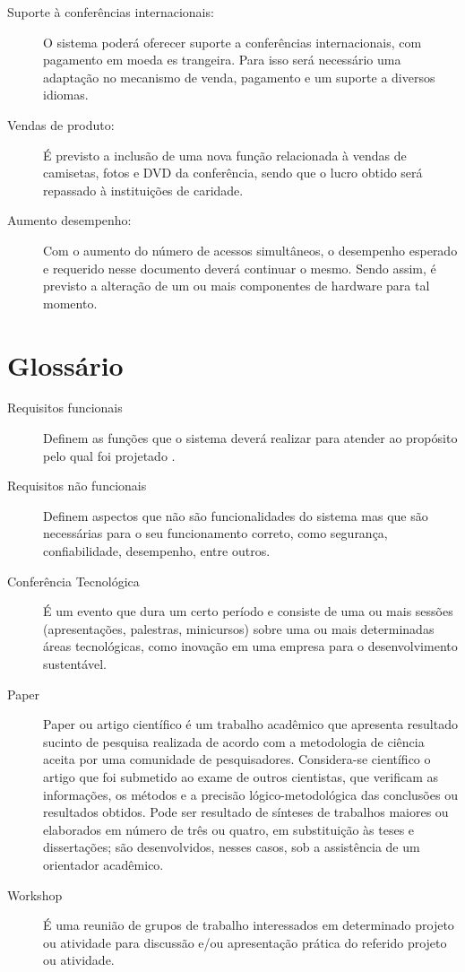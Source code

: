\documentclass[letter]{article}
\begin{document}
\begin{description}

\item[Suporte à conferências internacionais:]  O sistema poderá oferecer suporte a conferências internacionais, com pagamento em moeda es trangeira. Para isso será necessário uma adaptação no mecanismo de venda, pagamento e um suporte a diversos idiomas.

\item[Vendas de produto:]  É previsto a inclusão de uma nova função relacionada à vendas de camisetas, fotos e DVD da conferência, sendo que o lucro obtido será repassado à instituições de caridade.

\item[Aumento desempenho:]  Com o aumento do número de acessos simultâneos, o desempenho esperado e requerido nesse documento deverá continuar o mesmo. Sendo assim, é previsto a alteração de um ou mais componentes de hardware para tal momento. 
\end{description}




\section{Glossário}
\begin{description}
\item[Requisitos funcionais] 
Definem as funções que o sistema deverá realizar para atender ao propósito pelo qual foi projetado .
\item [Requisitos não funcionais]
Definem aspectos que não são funcionalidades do sistema mas que são necessárias para o seu funcionamento
correto, como segurança, confiabilidade, desempenho, entre outros.

\item[Conferência Tecnológica] É um evento que dura um certo período e consiste de uma ou mais sessões (apresentações, palestras, minicursos) sobre uma ou mais determinadas áreas tecnológicas, como inovação em uma empresa para o desenvolvimento sustentável.

\item[Paper] Paper ou artigo científico é um trabalho acadêmico que apresenta resultado sucinto de pesquisa realizada de acordo com a metodologia de ciência aceita por uma comunidade de pesquisadores. Considera-se científico o artigo que foi submetido ao exame de outros cientistas, que verificam as informações, os métodos e a precisão lógico-metodológica das conclusões ou resultados obtidos. Pode ser resultado de sínteses de trabalhos maiores ou elaborados em número de três ou quatro, em substituição às teses e dissertações; são desenvolvidos, nesses casos, sob a assistência de um orientador acadêmico.

\item[Workshop] É uma reunião de grupos de trabalho interessados em determinado projeto ou atividade para discussão e/ou apresentação prática do referido projeto ou atividade.
\end{description}
\end{document}
